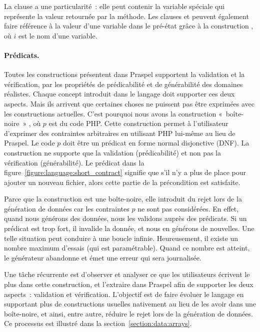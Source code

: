 La clause \aensures a une particularité~: elle peut contenir la variable
spéciale \aresult qui représente la valeur {\strong retournée} par la méthode.
Les clauses \aensures et \athrowable peuvent également faire {\strong référence}
à la valeur d'une variable dans le pré-état grâce à la construction , où
$i$ est le nom d'une variable.

\paragraph{Prédicats.} Toutes les constructions présentent dans Praspel
supportent la validation et la vérification, \ie par les propriétés de
prédicabilité et de générabilité des domaines réalistes. Chaque concept
introduit dans le langage doit supporter ces deux aspects. Mais ils arrivent que
certaines choses ne puissent pas être exprimées avec les constructions
actuelles. C'est pourquoi nous avons la construction «~boîte-noire~» ,
où $p$ est du code PHP. Cette construction permet à l'utilisateur d'exprimer des
contraintes arbitraires en utilisant PHP lui-même au lieu de Praspel. Le code
$p$ doit être un prédicat en forme normal {\strong disjonctive} (DNF). La
construction  ne supporte que la validation (prédicabilité) et non pas
la vérification (générabilité). Le prédicat  dans la
figure~\ref{figure:language:short_contract} signifie que s'il n'y a plus de
place pour ajouter un nouveau fichier, alors cette partie de la précondition est
satisfaite.

Parce que la construction  est une boîte-noire, elle introduit du rejet
lors de la génération de données car les contraintes $p$ ne sont pas
considérées. En effet, quand nous générons des données, nous les validons auprès
des prédicats. Si un prédicat est trop fort, il invalide la donnée, et nous en
générons de nouvelles. Une telle situation peut conduire à une boucle infinie.
Heureusement, il existe un nombre maximum d'essais (qui est paramétrable). Quand
ce nombre est atteint, le générateur abandonne et émet une erreur qui sera
journalisée.

Une tâche récurrente est d'observer et analyser ce que les utilisateurs écrivent
le plus dans cette construction, et l'extraire dans Praspel afin de supporter
les deux aspects~: validation et vérification. L'objectif est de faire évoluer
le langage en supportant plus de constructions usuelles nativement au lieu de
les avoir dans une boîte-noire, et ainsi, entre autre, réduire le rejet lors de
la génération de données. Ce processus est illustré dans la
section~\ref{section:data:arrays}.

